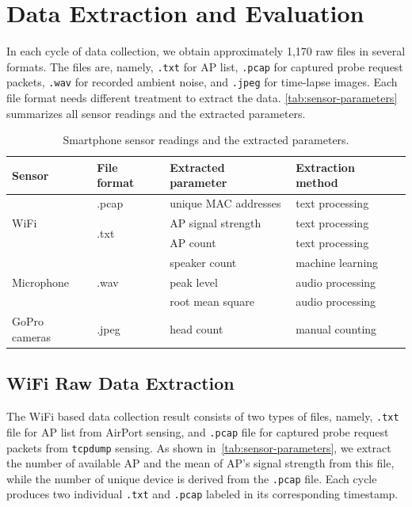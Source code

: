 \section{Data Extraction and Evaluation} %
\label{sec:data_extraction_and_evaluation}
In each cycle of data collection, we obtain approximately 1,170 raw files in several formats. The files are, namely, \verb|.txt| for \ac{AP} list, \verb|.pcap| for captured probe request packets, \verb|.wav| for recorded ambient noise, and \verb|.jpeg| for time-lapse images. Each file format needs different treatment to extract the data. \autoref{tab:sensor-parameters} summarizes all sensor readings and the extracted parameters.

\begin{table}[]
\centering
\caption{Smartphone sensor readings and the extracted parameters.}
\label{tab:sensor-parameters}
\begin{tabular}{llll}\toprule
Sensor     & File format & Extracted parameter & Extraction method\\ \midrule
\multirow{3}{*}{WiFi}       & .pcap 				& unique \ac{MAC} addresses     & text processing \\
       						& \multirow{2}{*}{.txt} & \ac{AP} signal strength     & text processing \\
       						&  						& \ac{AP} count            & text processing \\ \hline
\multirow{3}{*}{Microphone} & \multirow{3}{*}{.wav} & speaker count       & machine learning \\
 							&  						& peak level          & audio processing \\
 							&  						& root mean square    & audio processing \\ \hline
GoPro cameras				& .jpeg 				& head count       & manual counting\\
\bottomrule
\end{tabular}
\end{table}

\subsection{WiFi Raw Data Extraction} %
\label{sub:wifi_raw_data_extraction}
The WiFi based data collection result consists of two types of files, namely, \verb|.txt| file for \ac{AP} list from AirPort sensing, and \verb|.pcap| file for captured probe request packets from \verb|tcpdump| sensing. As shown in~\autoref{tab:sensor-parameters}, we extract the number of available \ac{AP} and the mean of \ac{AP}'s signal strength from this file, while the number of unique device is derived from the \verb|.pcap| file. Each cycle produces two individual \verb|.txt| and \verb|.pcap| labeled in its corresponding timestamp.

